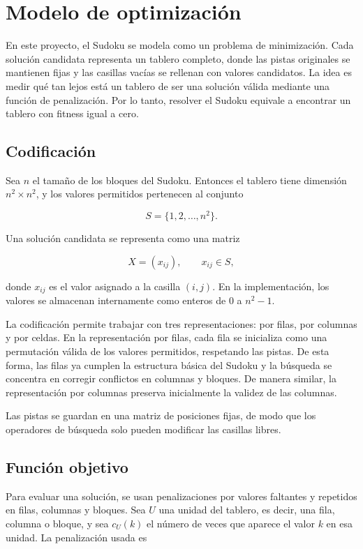 \documentclass{article}
\begin{document}
\section{Modelo de optimización}

En este proyecto, el Sudoku se modela como un problema de minimización. Cada solución candidata representa un tablero completo, donde las pistas originales se mantienen fijas y las casillas vacías se rellenan con valores candidatos. La idea es medir qué tan lejos está un tablero de ser una solución válida mediante una función de penalización. Por lo tanto, resolver el Sudoku equivale a encontrar un tablero con fitness igual a cero.

\subsection{Codificación}

Sea \(n\) el tamaño de los bloques del Sudoku. Entonces el tablero tiene dimensión \(n^2 \times n^2\), y los valores permitidos pertenecen al conjunto

\[
S = \{1,2,\ldots,n^2\}.
\]

Una solución candidata se representa como una matriz

\[
X = (x_{ij}), \qquad x_{ij}\in S,
\]

donde \(x_{ij}\) es el valor asignado a la casilla \((i,j)\). En la implementación, los valores se almacenan internamente como enteros de \(0\) a \(n^2-1\).

La codificación permite trabajar con tres representaciones: por filas, por columnas y por celdas. En la representación por filas, cada fila se inicializa como una permutación válida de los valores permitidos, respetando las pistas. De esta forma, las filas ya cumplen la estructura básica del Sudoku y la búsqueda se concentra en corregir conflictos en columnas y bloques. De manera similar, la representación por columnas preserva inicialmente la validez de las columnas.

Las pistas se guardan en una matriz de posiciones fijas, de modo que los operadores de búsqueda solo pueden modificar las casillas libres.
 
\subsection{Función objetivo}

Para evaluar una solución, se usan penalizaciones por valores faltantes y repetidos en filas, columnas y bloques. Sea \(U\) una unidad del tablero, es decir, una fila, columna o bloque, y sea \(c_U(k)\) el número de veces que aparece el valor \(k\) en esa unidad. La penalización usada es
\end{document}
